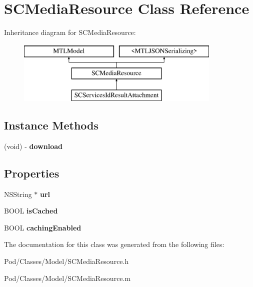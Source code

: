 \hypertarget{interface_s_c_media_resource}{}\section{S\+C\+Media\+Resource Class Reference}
\label{interface_s_c_media_resource}
Inheritance diagram for S\+C\+Media\+Resource\+:\begin{figure}[H]
\begin{center}
\leavevmode
\includegraphics[height=3.000000cm]{interface_s_c_media_resource}
\end{center}
\end{figure}
\subsection*{Instance Methods}
\begin{DoxyCompactItemize}
\item 
(void) -\/ {\bfseries download}\hypertarget{interface_s_c_media_resource_a4e903f903dda4c486df034e57f20c28f}{}\label{interface_s_c_media_resource_a4e903f903dda4c486df034e57f20c28f}

\end{DoxyCompactItemize}
\subsection*{Properties}
\begin{DoxyCompactItemize}
\item 
N\+S\+String $\ast$ {\bfseries url}\hypertarget{interface_s_c_media_resource_a2c94dd05313c0add5c2e8256c1372efc}{}\label{interface_s_c_media_resource_a2c94dd05313c0add5c2e8256c1372efc}

\item 
B\+O\+OL {\bfseries is\+Cached}\hypertarget{interface_s_c_media_resource_ad178b8594402a6a710cb26ba2ff32bb9}{}\label{interface_s_c_media_resource_ad178b8594402a6a710cb26ba2ff32bb9}

\item 
B\+O\+OL {\bfseries caching\+Enabled}\hypertarget{interface_s_c_media_resource_a4a0d1be6a5bf2c4b8eea7e324b7dc53d}{}\label{interface_s_c_media_resource_a4a0d1be6a5bf2c4b8eea7e324b7dc53d}

\end{DoxyCompactItemize}


The documentation for this class was generated from the following files\+:\begin{DoxyCompactItemize}
\item 
Pod/\+Classes/\+Model/S\+C\+Media\+Resource.\+h\item 
Pod/\+Classes/\+Model/S\+C\+Media\+Resource.\+m\end{DoxyCompactItemize}

